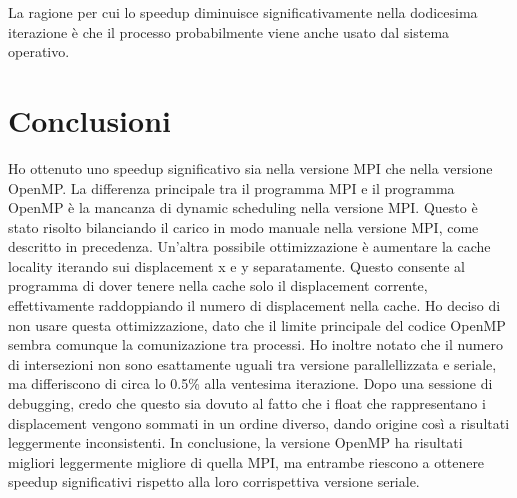 \documentclass[a4paper,11pt, twoside]{report}
\begin{document}
La ragione per cui lo speedup diminuisce significativamente nella dodicesima iterazione è che il processo probabilmente viene anche usato dal sistema operativo.
\section*{Conclusioni}
Ho ottenuto uno speedup significativo sia nella versione MPI che nella versione OpenMP.
La differenza principale tra il programma MPI e il programma OpenMP è la mancanza di dynamic scheduling nella versione MPI.
Questo è stato risolto bilanciando il carico in modo manuale nella versione MPI, come descritto in precedenza.
Un'altra possibile ottimizzazione è aumentare la cache locality iterando sui displacement x e y separatamente.
Questo consente al programma di dover tenere nella cache solo il displacement corrente, effettivamente raddoppiando il numero di displacement nella cache.
Ho deciso di non usare questa ottimizzazione, dato che il limite principale del codice OpenMP sembra comunque la comunizazione tra processi.
Ho inoltre notato che il numero di intersezioni non sono esattamente uguali tra versione parallellizzata e seriale, ma differiscono di circa lo 0.5\% alla ventesima iterazione.
Dopo una sessione di debugging, credo che questo sia dovuto al fatto che i float che rappresentano i displacement vengono sommati in un ordine diverso, dando origine così a risultati leggermente inconsistenti.
In conclusione, la versione OpenMP ha risultati migliori leggermente migliore di quella MPI, ma entrambe riescono a ottenere speedup significativi rispetto alla loro corrispettiva versione seriale.
\end{document}
